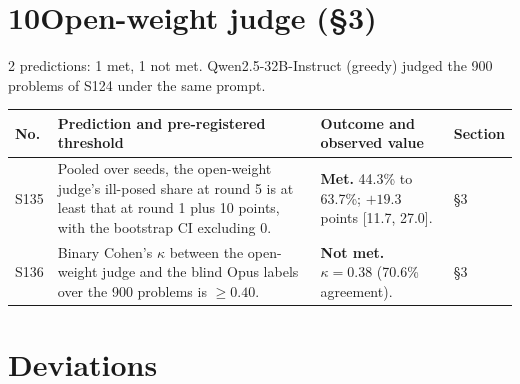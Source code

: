 \documentclass[10pt,a4paper]{article}
\newcommand{\met}{\textbf{Met.}}
\newcommand{\nmet}{\textbf{Not met.}}
\begin{document}
\section*{10\quad Open-weight judge (\S3)}
2 predictions: 1 met, 1 not met. Qwen2.5-32B-Instruct (greedy) judged the 900 problems of S124 under the same prompt.

\begingroup\small
\begin{longtable}{@{}L{0.9cm}L{7.8cm}L{6.1cm}L{1.3cm}@{}}
\toprule
No. & Prediction and pre-registered threshold & Outcome and observed value & Section \\
\midrule
\endfirsthead
\bottomrule
\endfoot
S135 & Pooled over seeds, the open-weight judge's ill-posed share at round 5 is at least that at round 1 plus 10 points, with the bootstrap CI excluding 0. & \met{} 44.3\% to 63.7\%; $+19.3$ points [11.7, 27.0]. & \S3 \\
S136 & Binary Cohen's $\kappa$ between the open-weight judge and the blind Opus labels over the 900 problems is $\ge 0.40$. & \nmet{} $\kappa = 0.38$ (70.6\% agreement). & \S3 \\
\end{longtable}
\endgroup

\section*{Deviations}
\end{document}
